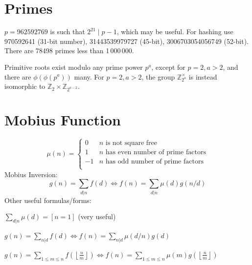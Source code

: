 \section{Primes}
	$p=962592769$ is such that $2^{21} \mid p-1$, which may be useful. For hashing
	use 970592641 (31-bit number), 31443539979727 (45-bit), 3006703054056749
	(52-bit). There are 78498 primes less than 1\,000\,000.

	Primitive roots exist modulo any prime power $p^a$, except for $p = 2, a > 2$, and there are $\phi(\phi(p^a))$ many.
	For $p = 2, a > 2$, the group $\mathbb Z_{2^a}^\times$ is instead isomorphic to $\mathbb Z_2 \times \mathbb Z_{2^{a-2}}$.

\section{Mobius Function}
\[
	\mu(n) = \begin{cases} 0 & n \textrm{ is not square free}\\ 1 & n \textrm{ has even number of prime factors}\\ -1 & n \textrm{ has odd number of prime factors}\\\end{cases}
\]
  Mobius Inversion:
  \[ g(n) = \sum_{d|n} f(d) \Leftrightarrow f(n) = \sum_{d|n} \mu(d)g(n/d) \]
  Other useful formulas/forms:

  $ \sum_{d | n} \mu(d) = [ n = 1] $ (very useful)

  $ g(n) = \sum_{n|d} f(d) \Leftrightarrow f(n) = \sum_{n|d} \mu(d/n)g(d)$

 $ g(n) = \sum_{1 \leq m \leq n} f(\left\lfloor\frac{n}{m}\right \rfloor ) \Leftrightarrow f(n) = \sum_{1\leq m\leq n} \mu(m)g(\left\lfloor\frac{n}{m}\right\rfloor)$
